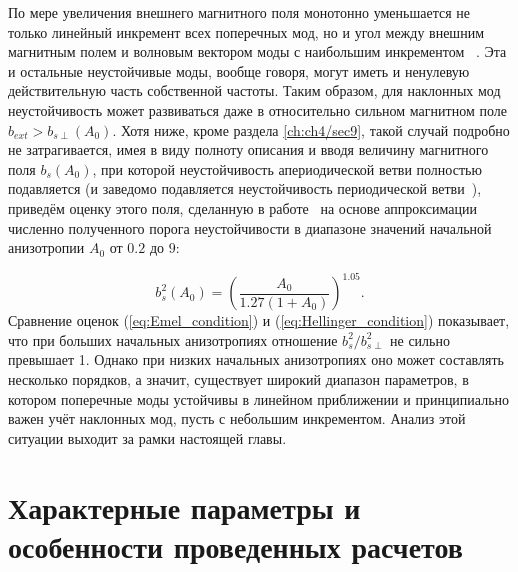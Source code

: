 По мере увеличения внешнего магнитного поля монотонно уменьшается не только линейный инкремент всех поперечных мод, но и угол между внешним магнитным полем и волновым вектором моды с наибольшим инкрементом
~\cite{Li2000,Camporeale2008,Moya2022}. Эта и остальные неустойчивые моды, вообще говоря, могут иметь и ненулевую действительную часть собственной частоты. Таким образом, для наклонных мод неустойчивость может развиваться даже в относительно сильном магнитном поле $b_{ext}>b_{s\perp}(A_0)$. Хотя ниже, кроме раздела \ref{ch:ch4/sec9}, такой случай подробно не затрагивается, имея в виду полноту описания и вводя величину магнитного поля $b_s(A_0)$, при которой неустойчивость апериодической ветви полностью подавляется (и заведомо подавляется неустойчивость периодической ветви~\cite{Li2000}), приведём оценку этого поля, сделанную в работе~\cite{Hellinger2014} на основе аппроксимации численно полученного порога неустойчивости в диапазоне значений начальной анизотропии $A_0$ от $0.2$ до $9$:

\begin{equation}
    b_{s}^2(A_0)=\left(\frac{A_0}{1.27(1+A_0)}\right)^{1.05}.
    \label{eq:Hellinger_condition}
\end{equation}
Сравнение оценок (\ref{eq:Emel_condition}) и (\ref{eq:Hellinger_condition}) показывает, что при больших начальных анизотропиях отношение $ b_{s}^2/ b_{s\perp}^2$ не сильно превышает 1. Однако при низких начальных анизотропиях оно может составлять несколько порядков,
а значит, существует широкий диапазон параметров, в котором поперечные моды устойчивы в линейном приближении и принципиально важен учёт наклонных мод, пусть с небольшим инкрементом. Анализ этой ситуации выходит за рамки настоящей главы.


\section{Характерные параметры и особенности проведенных расчетов}
\label{section_results}

